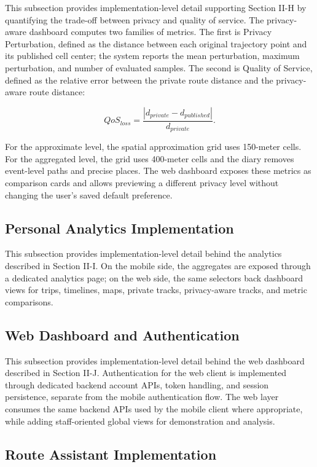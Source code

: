 \documentclass[conference,a4paper]{IEEEtran}
\begin{document}
This subsection provides implementation-level detail supporting Section II-H by quantifying the trade-off between privacy and quality of service. The privacy-aware dashboard computes two families of metrics. The first is Privacy Perturbation, defined as the distance between each original trajectory point and its published cell center; the system reports the mean perturbation, maximum perturbation, and number of evaluated samples. The second is Quality of Service, defined as the relative error between the private route distance and the privacy-aware route distance:

\begin{equation}
QoS_{loss} = \frac{|d_{private} - d_{published}|}{d_{private}}.
\end{equation}

For the approximate level, the spatial approximation grid uses 150-meter cells. For the aggregated level, the grid uses 400-meter cells and the diary removes event-level paths and precise places. The web dashboard exposes these metrics as comparison cards and allows previewing a different privacy level without changing the user's saved default preference.

\subsection{Personal Analytics Implementation}

This subsection provides implementation-level detail behind the analytics described in Section II-I. On the mobile side, the aggregates are exposed through a dedicated analytics page; on the web side, the same selectors back dashboard views for trips, timelines, maps, private tracks, privacy-aware tracks, and metric comparisons.

\subsection{Web Dashboard and Authentication}

This subsection provides implementation-level detail behind the web dashboard described in Section II-J. Authentication for the web client is implemented through dedicated backend account APIs, token handling, and session persistence, separate from the mobile authentication flow. The web layer consumes the same backend APIs used by the mobile client where appropriate, while adding staff-oriented global views for demonstration and analysis.

\subsection{Route Assistant Implementation}
\end{document}
